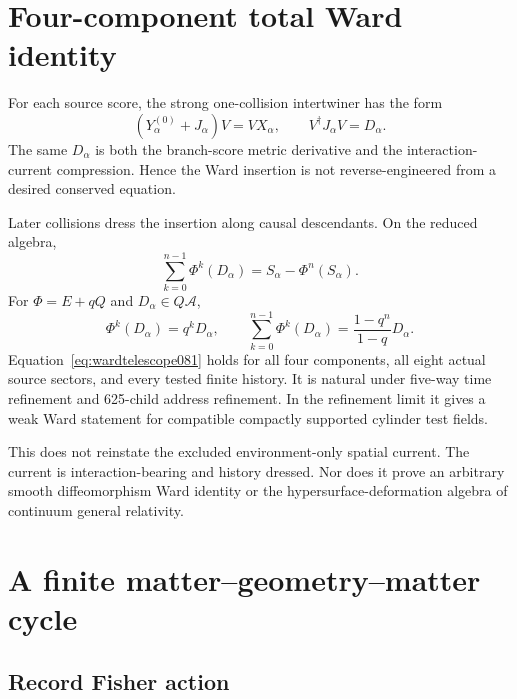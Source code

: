 \documentclass[11pt]{article}
\theoremstyle{definition}
\theoremstyle{remark}
\begin{document}
\section{Four-component total Ward identity}\label{sec:finiteward081}

For each source score, the strong one-collision intertwiner has the form
\begin{equation}\label{eq:strongward081}
 (Y^{(0)}_\alpha+J_\alpha)V=VX_\alpha,
 \qquad V^\dagger J_\alpha V=D_\alpha.
\end{equation}
The same $D_\alpha$ is both the branch-score metric derivative and the interaction-current compression. Hence the Ward insertion is not reverse-engineered from a desired conserved equation.

Later collisions dress the insertion along causal descendants. On the reduced algebra,
\begin{equation}\label{eq:wardtelescope081}
 \sum_{k=0}^{n-1}\Phi^k(D_\alpha)
 =S_\alpha-\Phi^n(S_\alpha).
\end{equation}
For $\Phi=E+qQ$ and $D_\alpha\in Q\mathcal A$,
\begin{equation}
 \Phi^k(D_\alpha)=q^kD_\alpha,
 \qquad
 \sum_{k=0}^{n-1}\Phi^k(D_\alpha)
 =\frac{1-q^n}{1-q}D_\alpha.
\end{equation}
Equation~\eqref{eq:wardtelescope081} holds for all four components, all eight actual source sectors, and every tested finite history. It is natural under five-way time refinement and 625-child address refinement. In the refinement limit it gives a weak Ward statement for compatible compactly supported cylinder test fields.

This does not reinstate the excluded environment-only spatial current. The current is interaction-bearing and history dressed. Nor does it prove an arbitrary smooth diffeomorphism Ward identity or the hypersurface-deformation algebra of continuum general relativity.

\section{A finite matter--geometry--matter cycle}\label{sec:finitebackreaction081}

\subsection{Record Fisher action}
\end{document}
